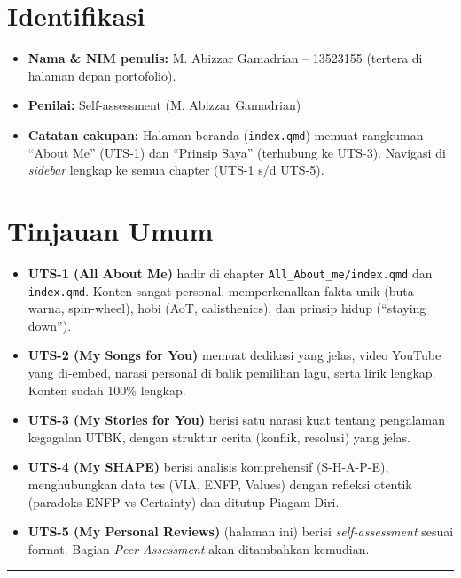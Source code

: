 \documentclass[
  letterpaper,
  DIV=11,
  numbers=noendperiod]{scrreprt}
\providecommand{\tightlist}{%
  \setlength{\itemsep}{0pt}\setlength{\parskip}{0pt}}
\begin{document}
\section{Identifikasi}\label{identifikasi}

\begin{itemize}
\tightlist
\item
  \textbf{Nama \& NIM penulis:} M. Abizzar Gamadrian -- 13523155
  (tertera di halaman depan portofolio).
\item
  \textbf{Penilai:} Self-assessment (M. Abizzar Gamadrian)
\item
  \textbf{Catatan cakupan:} Halaman beranda (\texttt{index.qmd}) memuat
  rangkuman ``About Me'' (UTS-1) dan ``Prinsip Saya'' (terhubung ke
  UTS-3). Navigasi di \emph{sidebar} lengkap ke semua chapter (UTS-1 s/d
  UTS-5).
\end{itemize}

\section{Tinjauan Umum}\label{tinjauan-umum}

\begin{itemize}
\tightlist
\item
  \textbf{UTS-1 (All About Me)} hadir di chapter
  \texttt{All\_About\_me/index.qmd} dan \texttt{index.qmd}. Konten
  sangat personal, memperkenalkan fakta unik (buta warna, spin-wheel),
  hobi (AoT, calisthenics), dan prinsip hidup (``staying down'').
\item
  \textbf{UTS-2 (My Songs for You)} memuat dedikasi yang jelas, video
  YouTube yang di-embed, narasi personal di balik pemilihan lagu, serta
  lirik lengkap. Konten sudah 100\% lengkap.
\item
  \textbf{UTS-3 (My Stories for You)} berisi satu narasi kuat tentang
  pengalaman kegagalan UTBK, dengan struktur cerita (konflik, resolusi)
  yang jelas.
\item
  \textbf{UTS-4 (My SHAPE)} berisi analisis komprehensif (S-H-A-P-E),
  menghubungkan data tes (VIA, ENFP, Values) dengan refleksi otentik
  (paradoks ENFP vs Certainty) dan ditutup Piagam Diri.
\item
  \textbf{UTS-5 (My Personal Reviews)} (halaman ini) berisi
  \emph{self-assessment} sesuai format. Bagian \emph{Peer-Assessment}
  akan ditambahkan kemudian.
\end{itemize}

\begin{center}\rule{0.5\linewidth}{0.5pt}\end{center}
\end{document}
